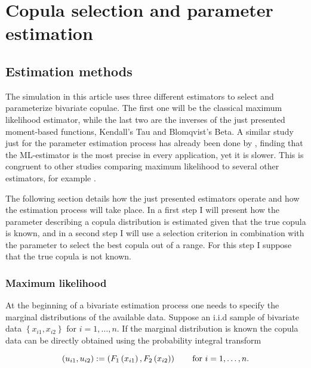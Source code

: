 
\chapter{Copula selection and parameter estimation} 

\label{Chapter2}


\section{Estimation methods}
\label{est-methods}

The simulation in this article uses three different estimators to select and parameterize bivariate copulae. The first one will be the classical maximum likelihood estimator, while the last  two are the inverses of the just presented moment-based functions, Kendall's Tau and Blomqvist's Beta. A similar study just for the parameter estimation process has already been done by \citet{genest2013copula}, finding that the ML-estimator is the most precise in every application, yet it is slower. This is congruent to other studies comparing maximum likelihood to several other estimators, for example \citet{weiss2011copula}.

The following section details how the just presented estimators operate and how the estimation process will take place. In a first step I will present how the parameter describing a copula distribution is estimated given that the true copula is known, and in a second step I will use a selection criterion in combination with the parameter to select the best copula out of a range. For this step I suppose that the true copula is not known.

\subsection{Maximum likelihood}

At the beginning of a bivariate estimation process one needs to specify the marginal distributions of the available data. Suppose an i.i.d sample of bivariate data $\left\lbrace x_{i1},x_{i2}\right\rbrace$ for $i = 1,\dots , n$. If the marginal distribution is known the copula data can be directly obtained using the probability integral transform

\begin{equation}
	\label{known-margins}
	\left(u_{i 1}, u_{i 2}\right):=\left(F_{1}\left(x_{i 1}\right), F_{2}\left(x_{i 2}\right)\right) \text {\qquad for } i=1, \ldots, n .
\end{equation}

